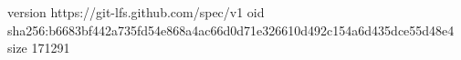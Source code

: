 version https://git-lfs.github.com/spec/v1
oid sha256:b6683bf442a735fd54e868a4ac66d0d71e326610d492c154a6d435dce55d48e4
size 171291
